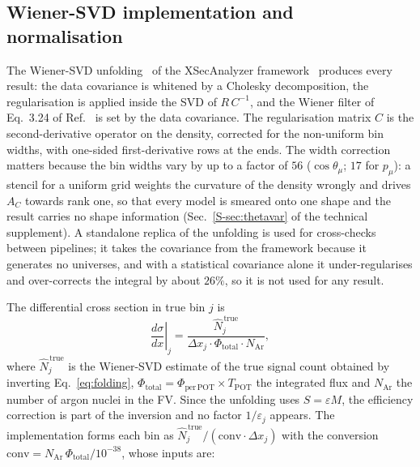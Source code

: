 \documentclass[11pt,a4paper]{article}
\newcommand{\suppref}[2]{#1~\ref{S-#2} of the technical supplement}
\begin{document}
\subsection{Wiener-SVD implementation and normalisation}

The Wiener-SVD unfolding~\cite{wienervsd} of the XSecAnalyzer framework~\cite{xsec_analyzer,uboone_tki}
produces every result: the data covariance is whitened by a Cholesky decomposition, the
regularisation is applied inside the SVD of $R\,C^{-1}$, and the Wiener filter of Eq.~3.24 of
Ref.~\cite{wienervsd} is set by the data covariance. The regularisation matrix $C$ is the
second-derivative operator on the density, corrected for the non-uniform bin widths, with one-sided
first-derivative rows at the ends. The width correction matters because the bin widths vary by up
to a factor of $56$ ($\cos\theta_\mu$; $17$ for $p_\mu$): a stencil for a
uniform grid weights the curvature of the density wrongly and drives $A_C$ towards rank one, so that
every model is smeared onto one shape and the result carries no shape information
(\suppref{Sec.}{sec:thetavar}). A standalone replica of the unfolding is used for cross-checks
between pipelines; it takes the covariance from the framework because it generates no universes,
and with a statistical covariance alone it under-regularises and over-corrects the integral by
about $26\%$, so it is not used for any result.

The differential cross section in true bin $j$ is
\begin{equation}
  \left.\frac{d\sigma}{dx}\right|_j
  = \frac{\hat{N}_j^{\,\mathrm{true}}}
         {\Delta x_j \cdot \Phi_{\mathrm{total}} \cdot N_{\mathrm{Ar}}},
  \label{eq:xsec_def}
\end{equation}
where $\hat{N}_j^{\,\mathrm{true}}$ is the Wiener-SVD estimate of the true signal count obtained by
inverting Eq.~\eqref{eq:folding}, $\Phi_{\mathrm{total}} = \Phi_{\mathrm{per\,POT}} \times
T_{\mathrm{POT}}$ the integrated flux and $N_{\mathrm{Ar}}$ the number of argon nuclei in the FV.
Since the unfolding uses $S=\varepsilon M$, the efficiency correction is part of the inversion and
no factor $1/\varepsilon_j$ appears. The implementation forms each bin as
$\hat N_j^{\,\mathrm{true}}/(\mathrm{conv}\cdot\Delta x_j)$ with the conversion
$\mathrm{conv} = N_{\mathrm{Ar}}\,\Phi_{\mathrm{total}}/10^{-38}$, whose inputs are:
\end{document}

